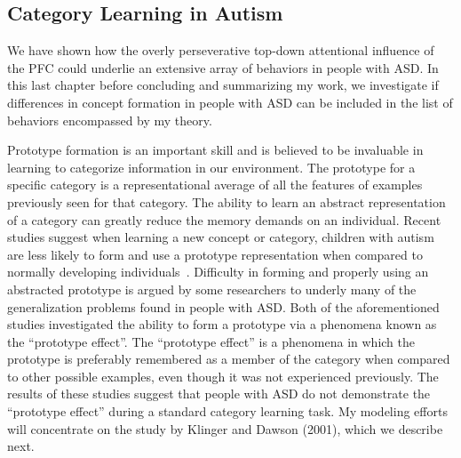 %
%

\subsection{Category Learning in Autism}
We have shown how the overly perseverative top-down attentional influence of the PFC could underlie an extensive array of behaviors in people with ASD.  In this last chapter before concluding and summarizing my work, we investigate if differences in concept formation in people with ASD can be included in the list of behaviors encompassed by my theory.  

Prototype formation is an important skill and is believed to be invaluable in learning to categorize information in our environment.  The prototype for a specific category is a representational average of all the features of examples previously seen for that category.  The ability to learn an abstract representation of a category can greatly reduce the memory demands on an individual. Recent studies suggest when learning a new concept or category, children with autism are less likely to form and use a prototype representation when compared to normally developing individuals~\cite{RefWorks:113,StraussMS:2009:Prototype}.  Difficulty in forming and properly using an abstracted prototype is argued by some researchers to underly many of the generalization problems found in people with ASD.   Both of the aforementioned studies investigated the ability to form a prototype via a phenomena known as the ``prototype effect''.  The ``prototype effect'' is a phenomena in which the prototype is preferably remembered as a member of the category when compared to other possible examples, even though it was not experienced previously.  The results of these studies suggest that people with ASD do not demonstrate the ``prototype effect'' during a standard category learning task.  My modeling efforts will concentrate on the study by Klinger and Dawson (2001), which we describe next. 


